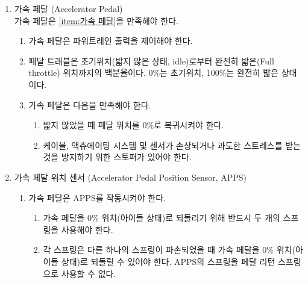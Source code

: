 \documentclass[final,a4paper,10pt]{report}
\begin{document}
\begin{enumerate}
  \item\label{rule:formula-technical.electronic-throttle-control.accelerator-pedal} 가속 페달 (Accelerator Pedal)\\
    가속 페달은 \ref{item:가속 페달}을 만족해야 한다.
    {\color{blue}
    \begin{enumerate}
      \item\label{rule:formula-technical.electronic-throttle-control.accelerator-pedal.controls-powertrain-output} 가속 페달은 파워트레인 출력을 제어해야 한다.
      \item\label{rule:formula-technical.electronic-throttle-control.accelerator-pedal.travel-percentage-scale} 페달 트래블은 초기위치(밟지 않은 상태, idle)로부터 완전히 밟은(Full throttle) 위치까지의 백분율이다. 0\%는 초기위치, 100\%는 완전히 밟은 상태이다.
      \item\label{rule:formula-technical.electronic-throttle-control.accelerator-pedal.design} 가속 페달은 다음을 만족해야 한다.
        \begin{enumerate}
          \item\label{rule:formula-technical.electronic-throttle-control.accelerator-pedal.design.returns-to-zero} 밟지 않았을 때 페달 위치를 0\%로 복귀시켜야 한다.
          \item\label{rule:formula-technical.electronic-throttle-control.accelerator-pedal.design.mechanical-stopper-required} 케이블, 액츄에이팅 시스템 및 센서가 손상되거나 과도한 스트레스를 받는 것을 방지하기 위한 스토퍼가 있어야 한다.
        \end{enumerate}
    \end{enumerate}
    }

  \item\label{rule:formula-technical.electronic-throttle-control.apps} 가속 페달 위치 센서 (Accelerator Pedal Position Sensor, APPS)
    \begin{enumerate}
      \item\label{rule:formula-technical.electronic-throttle-control.apps.dual-return-springs} 가속 페달은 APPS를 작동시켜야 한다.
        \begin{enumerate}
          \item\label{rule:formula-technical.electronic-throttle-control.apps.dual-return-springs.two-springs-required} 가속 페달을 0\% 위치(아이들 상태)로 되돌리기 위해 반드시 두 개의 스프링을 사용해야 한다.
          \item\label{rule:formula-technical.electronic-throttle-control.apps.dual-return-springs.apps-spring-excluded} 각 스프링은 다른 하나의 스프링이 파손되었을 때 가속 페달을 0\% 위치(아이들 상태)로 되돌릴 수 있어야 한다. APPS의 스프링을 페달 리턴 스프링으로 사용할 수 없다.
        \end{enumerate}


\end{enumerate}
\end{enumerate}
\end{document}
